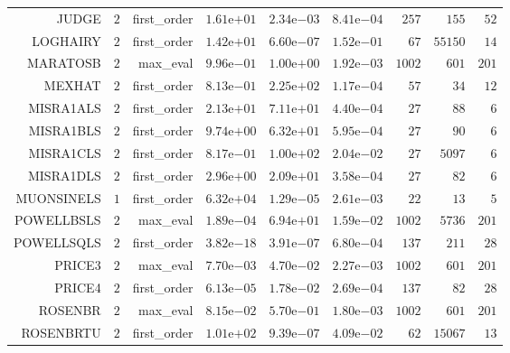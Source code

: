 \begin{longtable}{rrrrrrrrr}
JUDGE & \(     2\) & first\_order & \( 1.61\)e\(+01\) & \( 2.34\)e\(-03\) & \( 8.41\)e\(-04\) & \(   257\) & \(   155\) & \(    52\) \\
LOGHAIRY & \(     2\) & first\_order & \( 1.42\)e\(+01\) & \( 6.60\)e\(-07\) & \( 1.52\)e\(-01\) & \(    67\) & \( 55150\) & \(    14\) \\
MARATOSB & \(     2\) & max\_eval & \( 9.96\)e\(-01\) & \( 1.00\)e\(+00\) & \( 1.92\)e\(-03\) & \(  1002\) & \(   601\) & \(   201\) \\
MEXHAT & \(     2\) & first\_order & \( 8.13\)e\(-01\) & \( 2.25\)e\(+02\) & \( 1.17\)e\(-04\) & \(    57\) & \(    34\) & \(    12\) \\
MISRA1ALS & \(     2\) & first\_order & \( 2.13\)e\(+01\) & \( 7.11\)e\(+01\) & \( 4.40\)e\(-04\) & \(    27\) & \(    88\) & \(     6\) \\
MISRA1BLS & \(     2\) & first\_order & \( 9.74\)e\(+00\) & \( 6.32\)e\(+01\) & \( 5.95\)e\(-04\) & \(    27\) & \(    90\) & \(     6\) \\
MISRA1CLS & \(     2\) & first\_order & \( 8.17\)e\(-01\) & \( 1.00\)e\(+02\) & \( 2.04\)e\(-02\) & \(    27\) & \(  5097\) & \(     6\) \\
MISRA1DLS & \(     2\) & first\_order & \( 2.96\)e\(+00\) & \( 2.09\)e\(+01\) & \( 3.58\)e\(-04\) & \(    27\) & \(    82\) & \(     6\) \\
MUONSINELS & \(     1\) & first\_order & \( 6.32\)e\(+04\) & \( 1.29\)e\(-05\) & \( 2.61\)e\(-03\) & \(    22\) & \(    13\) & \(     5\) \\
POWELLBSLS & \(     2\) & max\_eval & \( 1.89\)e\(-04\) & \( 6.94\)e\(+01\) & \( 1.59\)e\(-02\) & \(  1002\) & \(  5736\) & \(   201\) \\
POWELLSQLS & \(     2\) & first\_order & \( 3.82\)e\(-18\) & \( 3.91\)e\(-07\) & \( 6.80\)e\(-04\) & \(   137\) & \(   211\) & \(    28\) \\
PRICE3 & \(     2\) & max\_eval & \( 7.70\)e\(-03\) & \( 4.70\)e\(-02\) & \( 2.27\)e\(-03\) & \(  1002\) & \(   601\) & \(   201\) \\
PRICE4 & \(     2\) & first\_order & \( 6.13\)e\(-05\) & \( 1.78\)e\(-02\) & \( 2.69\)e\(-04\) & \(   137\) & \(    82\) & \(    28\) \\
ROSENBR & \(     2\) & max\_eval & \( 8.15\)e\(-02\) & \( 5.70\)e\(-01\) & \( 1.80\)e\(-03\) & \(  1002\) & \(   601\) & \(   201\) \\
ROSENBRTU & \(     2\) & first\_order & \( 1.01\)e\(+02\) & \( 9.39\)e\(-07\) & \( 4.09\)e\(-02\) & \(    62\) & \( 15067\) & \(    13\) \\

\end{longtable}
